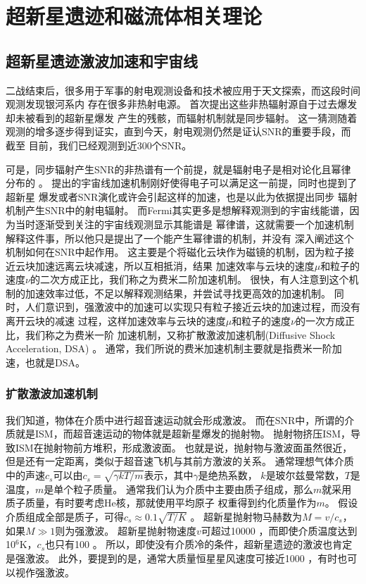 \chapter{超新星遗迹和磁流体相关理论}
\label{Theory}

\section{超新星遗迹激波加速和宇宙线}
\label{TheoryDSACR}
二战结束后，很多用于军事的射电观测设备和技术被应用于天文探索，而这段时间观测发现银河系内
存在很多非热射电源。
\citet{1953AZh....30...15S}首次提出这些非热辐射源自于过去爆发却未被看到的超新星爆发
产生的残骸，而辐射机制就是同步辐射。
这一猜测随着观测的增多逐步得到证实，直到今天，射电观测仍然是证认SNR的重要手段，而截至
目前，我们已经观测到近300个SNR\citep{2014BASI...42...47G}。

可是，同步辐射产生SNR的非热谱有一个前提，就是辐射电子是相对论化且幂律分布的
\citep{1970ranp.book.....P}。
\citet{Fermi1949}提出的宇宙线加速机制刚好使得电子可以满足这一前提，同时也提到了超新星
爆发或者SNR演化或许会引起这样的加速，\citet{1953AZh....30...15S}也是以此为依据提出同步
辐射机制产生SNR中的射电辐射。
而Fermi其实更多是想解释观测到的宇宙线能谱，因为当时逐渐受到关注的宇宙线观测显示其能谱是
幂律谱，这就需要一个加速机制解释这件事，所以他只是提出了一个能产生幂律谱的机制，并没有
深入阐述这个机制如何在SNR中起作用。
这主要是个将磁化云块作为磁镜的机制，因为粒子接近云块加速远离云块减速，所以互相抵消，结果
加速效率与云块的速度$\mu$和粒子的速度$\nu$的二次方成正比，我们称之为费米二阶加速机制。
很快，有人注意到这个机制的加速效率过低，不足以解释观测结果，并尝试寻找更高效的加速机制。
同时，人们意识到，强激波中的加速可以实现只有粒子接近云块的加速过程，而没有离开云块的减速
过程，这样加速效率与云块的速度$\mu$和粒子的速度$\nu$的一次方成正比，我们称之为费米一阶
加速机制，又称扩散激波加速机制(Diffusive Shock Acceleration, DSA)
\citep{1977ICRC...11..132A,1977SPhD...22..327K,Bell1978,Blandford1978}。
通常，我们所说的费米加速机制主要就是指费米一阶加速，也就是DSA。

\subsection{扩散激波加速机制}
我们知道，物体在介质中进行超音速运动就会形成激波。
而在SNR中，所谓的介质就是ISM，而超音速运动的物体就是超新星爆发的抛射物。
抛射物挤压ISM，导致ISM在抛射物前方堆积，形成激波面。
也就是说，抛射物与激波面虽然很近，但是还有一定距离，类似于超音速飞机与其前方激波的关系。
通常理想气体介质中的声速$c_s$可以由$c_s=\sqrt{\gamma kT/m}$表示，其中$\gamma$是绝热系数，
$k$是玻尔兹曼常数，$T$是温度，$m$是单个粒子质量。
通常我们认为介质中主要由质子组成，那么$m$就采用质子质量，有时要考虑He核，那就使用平均原子
权重得到约化质量作为$m$。
假设介质组成全部是质子，可得$c_s\approx 0.1\sqrt{T/K}$ \kms 。
超新星抛射物马赫数为$M=v/c_s$，如果$M\gg 1$则为强激波。
超新星抛射物速度$v$可超过10000 \kms ，而即使介质温度达到10$^6$K，$c_s$也只有100 \kms 。
所以，即使没有介质冷的条件，超新星遗迹的激波也肯定是强激波。
此外，要提到的是，通常大质量恒星星风速度可接近1000 \kms，有时也可以视作强激波。

